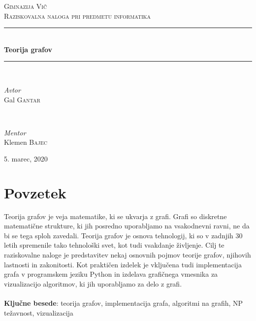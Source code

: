 \documentclass[11pt]{article}
\begin{document}
\begin{titlepage}
	\newcommand{\HRule}{\rule{\linewidth}{0.5mm}} %
	
	\center %
	
	\null\vspace{4cm} %
	
	\textsc{\LARGE Gimnazija Vič}\\[1.5cm] %
	
	\textsc{\Large Raziskovalna naloga pri predmetu informatika}\\[0.5cm] %
	
	\HRule\\[0.4cm]
	
	{\huge\bfseries Teorija grafov}\\[0.4cm] %
	
	\HRule\\[1.5cm]
	
	\begin{minipage}{0.4\textwidth}
		\begin{flushleft}
			\large
			\textit{Avtor}\\
			Gal \textsc{Gantar}
		\end{flushleft}
	\end{minipage}
	~
	\begin{minipage}{0.4\textwidth}
		\begin{flushright}
			\large
			\textit{Mentor}\\
			Klemen \textsc{Bajec}
		\end{flushright}
	\end{minipage}
	
	\vfill
	
	{\large 5. marec, 2020}
	
\end{titlepage}

\null
\newpage

\section*{Povzetek}

Teorija grafov je veja matematike, ki se ukvarja z grafi. Grafi so diskretne matematične strukture, ki jih posredno uporabljamo na vsakodnevni ravni, ne da bi se tega sploh zavedali. Teorija grafov je osnova tehnologij, ki so v zadnjih 30 letih spremenile tako tehnološki svet, kot tudi vsakdanje življenje. Cilj te raziskovalne naloge je predstavitev nekaj osnovnih pojmov teorije grafov, njihovih lastnosti in zakonitosti. Kot praktičen izdelek je vključena tudi implementacija grafa v programskem jeziku Python in izdelava grafičnega vmesnika za vizualizacijo algoritmov, ki jih uporabljamo za delo z grafi.
\\ \\
\textbf{Ključne besede}: teorija grafov, implementacija grafa, algoritmi na grafih, NP težavnost, vizualizacija
\end{document}
